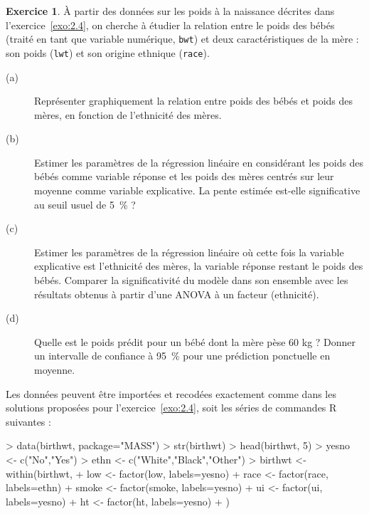 \documentclass[11pt]{report}
\theoremstyle{definition}
\newtheorem{exo}{Exercice}[chapter]
\newcommand{\R}{\textsf{R}\xspace}
\begin{document}
\begin{exo}
À partir des données sur les poids à la naissance décrites dans
l'exercice~\ref{exo:2.4}, on cherche à étudier la relation entre le poids des
bébés (traité en tant que variable numérique, \texttt{bwt}) et deux
caractéristiques de la mère : son poids (\texttt{lwt}) et son origine
ethnique (\texttt{race}).
\begin{description}
\item[(a)] Représenter graphiquement la relation entre poids des bébés et
  poids des mères, en fonction de l'ethnicité des mères.
\item[(b)] Estimer les paramètres de la régression linéaire en considérant
  les poids des bébés comme variable réponse et les poids des mères centrés
  sur leur moyenne comme variable explicative. La pente estimée est-elle
  significative au seuil usuel de 5~\% ?
\item[(c)] Estimer les paramètres de la régression linéaire où cette fois la
  variable explicative est l'ethnicité des mères, la variable réponse
  restant le poids des bébés. Comparer la significativité du modèle dans son
  ensemble avec les résultats obtenus à partir d'une ANOVA à un facteur
  (ethnicité). 
\item[(d)] Quelle est le poids prédit pour un bébé dont la mère pèse 60 kg ?
  Donner un intervalle de confiance à 95~\% pour une prédiction ponctuelle
  en moyenne.
\end{description}
\begin{sol}
Les données peuvent être importées et recodées exactement comme dans les
solutions proposées pour l'exercice~\ref{exo:2.4}, soit les séries de
commandes \R suivantes :
\begin{Schunk}
\begin{Sinput}
> data(birthwt, package="MASS")
> str(birthwt)
> head(birthwt, 5)
> yesno <- c("No","Yes")
> ethn <- c("White","Black","Other")
> birthwt <- within(birthwt, {
+   low <- factor(low, labels=yesno)
+   race <- factor(race, labels=ethn)
+   smoke <- factor(smoke, labels=yesno)
+   ui <- factor(ui, labels=yesno)
+   ht <- factor(ht, labels=yesno)
+ })
\end{Sinput}
\end{Schunk}


\end{sol}
\end{exo}
\end{document}
